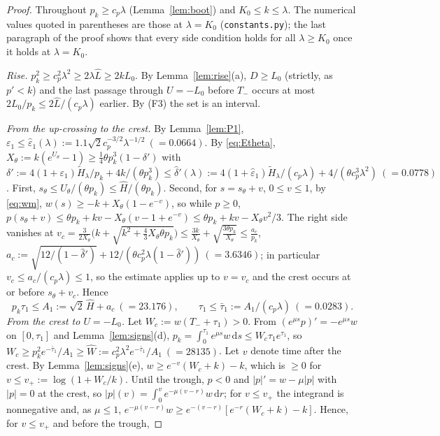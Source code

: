 \documentclass[11pt,a4paper]{article}
\theoremstyle{remark}\newtheorem{remark}[theorem]{Remark}
\newcommand{\dd}{\,\mathrm d}
\begin{document}
\begin{proof}
Throughout $p_k\ge c_p\lambda$ (Lemma~\ref{lem:boot}) and $K_0\le k\le\lambda$. The numerical values
quoted in parentheses are those at $\lambda=K_0$ (\texttt{constants.py}); the last paragraph of the proof
shows that every side condition holds for all $\lambda\ge K_0$ once it holds at $\lambda=K_0$.

\emph{Rise.} $p_k^2\ge c_p^2\lambda^2\ge2\lambda\hat L\ge2kL_0$. By Lemma~\ref{lem:rise}(a), $D\ge L_0$
(strictly, as $p'<k$) and the last passage through $U=-L_0$ before $T_-$ occurs at most
$2L_0/p_k\le2\hat L/(c_p\lambda)$ earlier. By (F3) the set is an interval.

\emph{From the up-crossing to the crest.} By Lemma~\ref{lem:P1},
$\varepsilon_1\le\hat\varepsilon_1(\lambda):=1.1\sqrt2c_p^{-3/2}\lambda^{-1/2}\ (=0.0664)$. By \eqref{eq:Etheta},
$X_\theta:=k(e^{U_\theta}-1)\ge\tfrac14\theta p_k^3(1-\delta')$ with
$\delta':=4(1+\varepsilon_1)\tilde H_\lambda/p_k+4k/(\theta p_k^3)\le
\hat\delta'(\lambda):=4(1+\hat\varepsilon_1)\tilde H_\lambda/(c_p\lambda)+4/(\theta c_p^3\lambda^2)\ (=0.0778)$. First,
$s_\theta\le U_\theta/(\theta p_k)\le\hat H/(\theta p_k)$. Second, for $s=s_\theta+v$, $0\le v\le1$, by
\eqref{eq:wm}, $w(s)\ge-k+X_\theta(1-e^{-v})$, so while $p\ge0$,
$p(s_\theta+v)\le\theta p_k+kv-X_\theta(v-1+e^{-v})\le\theta p_k+kv-X_\theta v^2/3$. The right side
vanishes at $v_c=\frac{3}{2X_\theta}\bigl(k+\sqrt{k^2+\tfrac43X_\theta\theta p_k}\bigr)
\le\frac{3k}{X_\theta}+\sqrt{\frac{3\theta p_k}{X_\theta}}\le\frac{a_c}{p_k}$,
$a_c:=\sqrt{12/(1-\hat\delta')}+12/(\theta c_p^2\lambda(1-\hat\delta'))\ (=3.6346)$; in particular
$v_c\le a_c/(c_p\lambda)\le1$, so the estimate applies up to $v=v_c$ and the crest occurs at or before
$s_\theta+v_c$. Hence
\[
p_k\tau_1\le A_1:=\sqrt2\,\hat H+a_c\ (=23.176),\qquad \tau_1\le\bar\tau_1:=A_1/(c_p\lambda)\ (=0.0283).
\]
\emph{From the crest to $U=-L_0$.} Let $W_c:=w(T_-+\tau_1)>0$. From $(e^{\mu s}p)'=-e^{\mu s}w$ on
$[0,\tau_1]$ and Lemma~\ref{lem:signs}(d), $p_k=\int_0^{\tau_1}e^{\mu s}w\dd s\le W_c\tau_1e^{\tau_1}$,
so $W_c\ge p_k^2e^{-\bar\tau_1}/A_1\ge\hat W:=c_p^2\lambda^2e^{-\bar\tau_1}/A_1\ (=28135)$. Let $v$
denote time after the crest. By Lemma~\ref{lem:signs}(e), $w\ge e^{-v}(W_c+k)-k$, which is $\ge0$ for
$v\le v_+:=\log(1+W_c/k)$. Until the trough, $p<0$ and $|p|'=w-\mu|p|$ with $|p|=0$ at the crest, so
$|p|(v)=\int_0^ve^{-\mu(v-r)}w\dd r$; for $v\le v_+$ the integrand is nonnegative and, as $\mu\le1$,
$e^{-\mu(v-r)}w\ge e^{-(v-r)}[e^{-r}(W_c+k)-k]$. Hence, for $v\le v_+$ and before the trough,

\end{proof}
\end{document}
